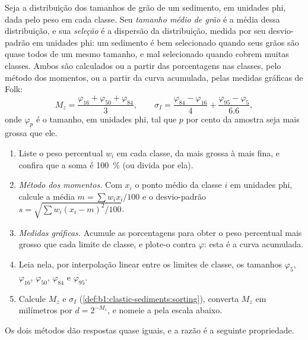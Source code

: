 \begin{definition}\label{def:b1:clastic-sediments:sorting}
Seja a distribuição dos tamanhos de grão de um sedimento, em unidades phi, dada pelo peso em cada classe. Seu \emph{tamanho médio de grão} é a média dessa distribuição, e sua \emph{seleção} é a dispersão da distribuição, medida por seu desvio-padrão em unidades phi: um sedimento é bem selecionado quando seus grãos são quase todos de um mesmo tamanho, e mal selecionado quando cobrem muitas classes. Ambos são calculados ou a partir das porcentagens nas classes, pelo método dos momentos, ou a partir da curva acumulada, pelas medidas gráficas de Folk:
\[
  M_z = \frac{\varphi_{16} + \varphi_{50} + \varphi_{84}}{3}, \qquad
  \sigma_I = \frac{\varphi_{84} - \varphi_{16}}{4} + \frac{\varphi_{95} - \varphi_{5}}{6.6},
\]
onde $\varphi_p$ é o tamanho, em unidades phi, tal que $p$ por cento da amostra seja mais grossa que ele.
\end{definition}

\begin{method}\label{met:b1:clastic-sediments:graphic}
\begin{enumerate}
  \item Liste o peso percentual $w_i$ em cada classe, da mais grossa à mais fina, e confira que a soma é \qty{100}{\percent} (ou divida por ela).
  \item \emph{Método dos momentos.} Com $x_i$ o ponto médio da classe $i$ em unidades phi, calcule a média $m = \sum w_i x_i / 100$ e o desvio-padrão $s = \sqrt{\sum w_i (x_i - m)^2 / 100}$.
  \item \emph{Medidas gráficas.} Acumule as porcentagens para obter o peso percentual mais grosso que cada limite de classe, e plote-o contra $\varphi$: esta é a curva acumulada.
  \item Leia nela, por interpolação linear entre os limites de classe, os tamanhos $\varphi_5$, $\varphi_{16}$, $\varphi_{50}$, $\varphi_{84}$ e $\varphi_{95}$.
  \item Calcule $M_z$ e $\sigma_I$ (\cref{def:b1:clastic-sediments:sorting}), converta $M_z$ em milímetros por $d = 2^{-M_z}$, e nomeie a  pela escala abaixo.
\end{enumerate}
\end{method}

Os dois métodos dão respostas quase iguais, e a razão é a seguinte propriedade.

